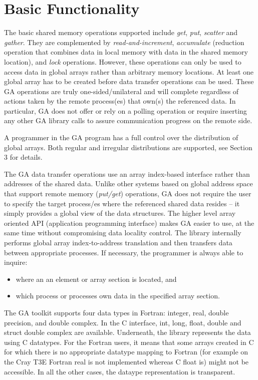 \section{Basic Functionality}

The basic shared memory operations supported include \emph{get}, \emph{put},
\emph{scatter} and \emph{gather}. They are complemented by 
\emph{read-and-increment}, \emph{accumulate} (reduction operation that combines
data in local memory with data in the shared memory location), and \emph{lock}
operations. However, these operations can only be used to access data in global
arrays rather than arbitrary memory locations. At least one global array has to
be created before data transfer operations can be used. These GA operations are
truly one-sided/unilateral and will complete regardless of actions taken by the
remote process(es) that own(s) the referenced data. In particular, GA does not
offer or rely on a polling operation or require inserting any other GA library
calls to assure communication progress on the remote side. 

A programmer in the GA program has a full control over the distribution of
global arrays. Both regular and irregular distributions are supported, see
Section 3 for details. 

The GA data transfer operations use an array index-based interface rather than
addresses of the shared data. Unlike other systems based on global address
space that support remote memory (\emph{put/get}) operations, GA does not
require the user to specify the target process/es where the referenced shared
data resides -- it simply provides a global view of the data structures. The
higher level array oriented API (application programming interface) makes GA
easier to use, at the same time without compromising data locality control. The
library internally performs global array index-to-address translation and then
transfers data between appropriate processes. If necessary, the programmer is
always able to inquire: 
\begin{itemize}
\item where an an element or array section is located, and 
\item which process or processes own data in the specified array section. 
\end{itemize}
The GA toolkit supports four data types in Fortran: integer, real, double
precision, and double complex. In the C interface, int, long, float, double and
struct double complex are available. Underneath, the library represents the
data using C datatypes. For the Fortran users, it means that some arrays
created in C for which there is no appropriate datatype mapping to Fortran (for
example on the Cray T3E Fortran real is not implemented whereas C float is)
might not be accessible.  In all the other cases, the dataype representation is
transparent. 


